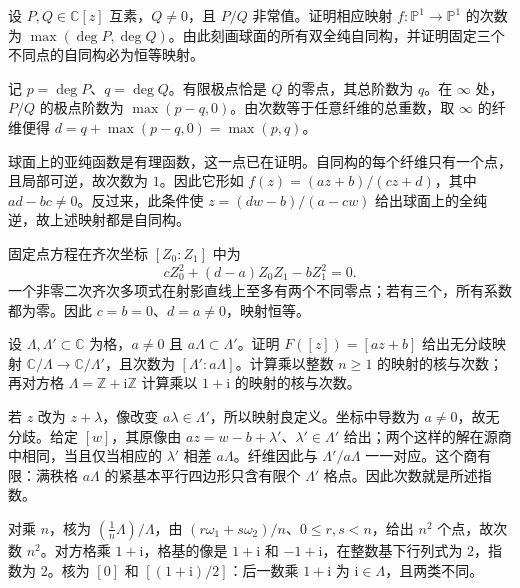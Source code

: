 \begin{exercise}
	\label{g4:ex:0201:rational-degree}
	设 \(P,Q\in\mathbb C[z]\) 互素，\(Q\ne0\)，且 \(P/Q\) 非常值。证明相应映射 \(f:\mathbb P^1\to\mathbb P^1\) 的次数为 \(\max(\deg P,\deg Q)\)。由此刻画球面的所有双全纯自同构，并证明固定三个不同点的自同构必为恒等映射。
\end{exercise}
\begin{solution}
	记 \(p=\deg P\)、\(q=\deg Q\)。有限极点恰是 \(Q\) 的零点，其总阶数为 \(q\)。在 \(\infty\) 处，\(P/Q\) 的极点阶数为 \(\max(p-q,0)\)。由次数等于任意纤维的总重数，取 \(\infty\) 的纤维便得 \(d=q+\max(p-q,0)=\max(p,q)\)。

	球面上的亚纯函数是有理函数，这一点已在证明。自同构的每个纤维只有一个点，且局部可逆，故次数为 \(1\)。因此它形如 \(f(z)=(az+b)/(cz+d)\)，其中 \(ad-bc\ne0\)。反过来，此条件使 \(z=(dw-b)/(a-cw)\) 给出球面上的全纯逆，故上述映射都是自同构。

	固定点方程在齐次坐标 \([Z_0:Z_1]\) 中为
	\[
		cZ_0^2+(d-a)Z_0Z_1-bZ_1^2=0.
	\]
	一个非零二次齐次多项式在射影直线上至多有两个不同零点；若有三个，所有系数都为零。因此 \(c=b=0\)、\(d=a\ne0\)，映射恒等。
\end{solution}

\begin{exercise}
	\label{g4:ex:0201:torus-isogeny}
	设 \(\Lambda,\Lambda'\subset\mathbb C\) 为格，\(a\ne0\) 且 \(a\Lambda\subset\Lambda'\)。证明 \(F([z])=[az+b]\) 给出无分歧映射 \(\mathbb C/\Lambda\to\mathbb C/\Lambda'\)，且次数为 \([\Lambda':a\Lambda]\)。计算乘以整数 \(n\geq1\) 的映射的核与次数；再对方格 \(\Lambda=\mathbb Z+\mathrm{i}\mathbb Z\) 计算乘以 \(1+\mathrm{i}\) 的映射的核与次数。
\end{exercise}
\begin{solution}
	若 \(z\) 改为 \(z+\lambda\)，像改变 \(a\lambda\in\Lambda'\)，所以映射良定义。坐标中导数为 \(a\ne0\)，故无分歧。给定 \([w]\)，其原像由 \(az=w-b+\lambda'\)、\(\lambda'\in\Lambda'\) 给出；两个这样的解在源商中相同，当且仅当相应的 \(\lambda'\) 相差 \(a\Lambda\)。纤维因此与 \(\Lambda'/a\Lambda\) 一一对应。这个商有限：满秩格 \(a\Lambda\) 的紧基本平行四边形只含有限个 \(\Lambda'\) 格点。因此次数就是所述指数。

	对乘 \(n\)，核为 \((\tfrac1n\Lambda)/\Lambda\)，由 \((r\omega_1+s\omega_2)/n\)、\(0\leq r,s<n\)，给出 \(n^2\) 个点，故次数 \(n^2\)。对方格乘 \(1+\mathrm{i}\)，格基的像是 \(1+\mathrm{i}\) 和 \(-1+\mathrm{i}\)，在整数基下行列式为 \(2\)，指数为 \(2\)。核为 \([0]\) 和 \([(1+\mathrm{i})/2]\)：后一数乘 \(1+\mathrm{i}\) 为 \(\mathrm{i}\in\Lambda\)，且两类不同。
\end{solution}

